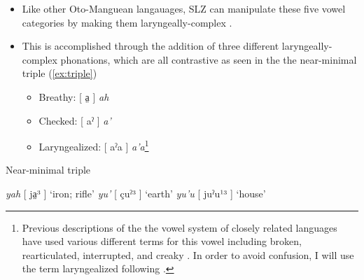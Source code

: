 \documentclass[12pt, letterpaper]{article}
\begin{document}
\begin{itemize}
	\item Like other Oto-Manguean langauages, SLZ can manipulate these five vowel categories by making them laryngeally-complex \citep{silvermanLaryngealComplexityOtomanguean1997}.

	\item This is accomplished through the addition of three different laryngeally-complex phonations, which are all contrastive as seen in the the near-minimal triple (\ref{ex:triple})
		\begin{itemize}
			\item Breathy: [ a̤ ] \textit{ah} 
			\item Checked: [ aˀ ] \textit{a'}
			\item Laryngealized: [ aˀa ] \textit{a'a}\footnote{Previous descriptions of the the vowel system of closely related languages have used various different terms for this vowel including broken, rearticulated, interrupted, and creaky \citep{longDiccionarioZapotecoSan2005,avelinoAcousticElectroglottographicAnalyses2010,avelinobecerraTopicsYalalagZapotec2004,sonnenscheinDescriptiveGrammarSan2005,adlerAcousticsPhonationTypes2016}. In order to avoid confusion, I will use the term laryngealized following \citet{avelinoAcousticElectroglottographicAnalyses2010}.}
		\end{itemize}
\end{itemize}

\begin{exe}
	\ex \label{ex:triple} Near-minimal triple
	\begin{xlist} 
		\ex \textit{yah} [ ja̤³ ] `iron; rifle'
		\ex \textit{yu'} [ çuˀ³ ] `earth'
		\ex \textit{yu'u} [ juˀu¹³ ] `house' 
	\end{xlist} 
\end{exe} 
\end{document}
